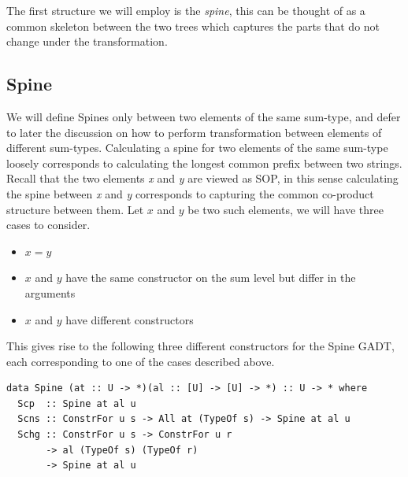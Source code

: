 \documentclass[11pt, titlepage]{article}
\begin{document}
The first structure we will employ is the \emph{spine}, this can be thought of as a common skeleton between 
the two trees which captures the parts that do not change under the transformation.

\subsection{Spine}\label{spine}

We will define Spines only between two elements of the same sum-type, and defer to later the discussion on how
to perform transformation between elements of different sum-types. Calculating a spine for two elements of the same sum-type 
loosely corresponds to calculating the longest common prefix between two strings. Recall that the two 
elements \emph{x} and \emph{y} are viewed as SOP, in this sense calculating the
spine between \emph{x} and \emph{y} corresponds to capturing the common
co-product structure between them. Let $x$ and $y$ be two such elements, we will have three cases to
consider. 
\begin{itemize}
  \item $x = y$
  \item $x$ and $y$ have the same constructor on the sum level but differ in the 
  arguments
  \item $x$ and $y$ have different constructors
\end{itemize}

This gives rise
to the following three different constructors for the Spine GADT, each
corresponding to one of the cases described above.

\begin{verbatim}
data Spine (at :: U -> *)(al :: [U] -> [U] -> *) :: U -> * where
  Scp  :: Spine at al u
  Scns :: ConstrFor u s -> All at (TypeOf s) -> Spine at al u
  Schg :: ConstrFor u s -> ConstrFor u r
       -> al (TypeOf s) (TypeOf r)
       -> Spine at al u
\end{verbatim}
\end{document}
